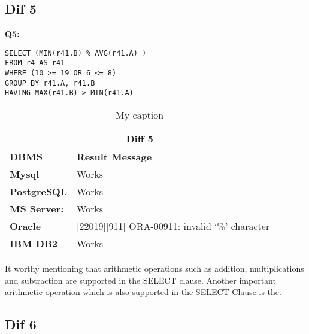\subsection{Dif 5}
  
\begin{mdframed}[backgroundcolor=lightgray!20] 
\textbf{Q5:}
\begin{lstlisting}
SELECT (MIN(r41.B) % AVG(r41.A) ) 
FROM r4 AS r41
WHERE (10 >= 19 OR 6 <= 8)   
GROUP BY r41.A, r41.B
HAVING MAX(r41.B) > MIN(r41.A) 
\end{lstlisting}
\end{mdframed}

\begin{table}[h]
\centering
\caption{My caption}
\label{my-label}
\begin{tabular}{|p{2cm}|p{12cm}|}
\hline
\multicolumn{2}{|c|}{\textbf{Diff 5}}                                                               \\ \hline
\textbf{DBMS}                              & \textbf{Result Message}                                \\ \hline
{\color[HTML]{333333} \textbf{Mysql}}      & {\color[HTML]{333333} Works}                           \\ \hline
{\color[HTML]{333333} \textbf{PostgreSQL}} & {\color[HTML]{333333} Works}                           \\ \hline
{\color[HTML]{333333} \textbf{MS Server:}} & {\color[HTML]{333333} Works}                           \\ \hline
\textbf{Oracle}                            & {[}22019{]}{[}911{]} ORA-00911: invalid ‘\%’ character \\ \hline
\textbf{IBM DB2}                           & Works                                                  \\ \hline
\end{tabular}
\end{table}

It worthy mentioning that arithmetic operations such as addition, multiplications and  subtraction are supported in the SELECT clause. Another important arithmetic operation which is also  supported in the SELECT Clause is the.

\subsection{Dif 6}
  
